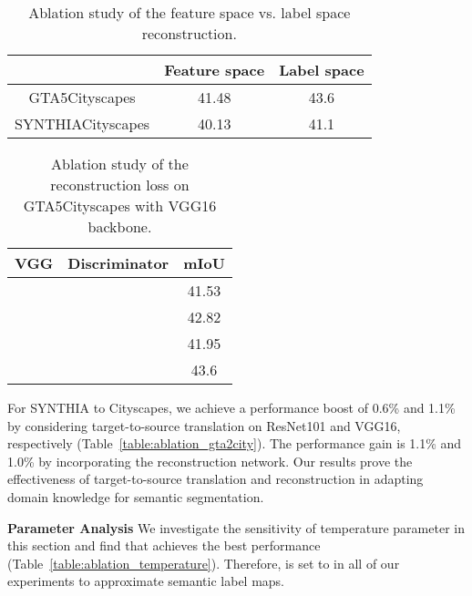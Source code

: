 \documentclass[runningheads]{llncs}
\begin{document}
	
	\begin{table}[t]
		\caption{Ablation study of the feature space vs. label space reconstruction.}
		\label{table:ablation_recons}
		
		\footnotesize
		\setlength\tabcolsep{10pt}
		\begin{center}
			\begin{tabularx}{.75\textwidth}{ ccc @{} }
				\toprule
& Feature space & Label space \\
				\midrule
				GTA5Cityscapes & 41.48 & 43.6 \\
				\midrule
				SYNTHIACityscapes & 40.13 & 41.1 \\
				\bottomrule
			\end{tabularx}
		\end{center}
		\vspace{-0.2in}
	\end{table}
	
	
\begin{wraptable}{r}{0.5\textwidth}
		\caption{Ablation study of the reconstruction loss on GTA5Cityscapes with VGG16 backbone.}
		\label{table:ablation_recons_loss}
		
		\footnotesize
		\setlength\tabcolsep{6pt}
		\begin{center}
			\begin{tabularx}{.4\textwidth}{ cc|c @{} }
				\toprule
VGG & Discriminator & mIoU \\
				\midrule
				& & 41.53 \\
				\cmark & & 42.82 \\
				& \cmark & 41.95 \\
				\cmark & \cmark & 43.6 \\
				\bottomrule
			\end{tabularx}
		\end{center}
\end{wraptable}
	
	For SYNTHIA to Cityscapes, we achieve a performance boost of 0.6\% and 1.1\% by considering target-to-source translation on ResNet101 and VGG16, respectively (Table~\ref{table:ablation_gta2city}). The performance gain is 1.1\% and 1.0\% by incorporating the reconstruction network. Our results prove the effectiveness of target-to-source translation and reconstruction in adapting domain knowledge for semantic segmentation.
	
	{\textbf{Parameter Analysis}} We investigate the sensitivity of temperature parameter  in this section and find that  achieves the best performance (Table~\ref{table:ablation_temperature}). Therefore,  is set to  in all of our experiments to approximate semantic label maps. 
	
\end{document}
